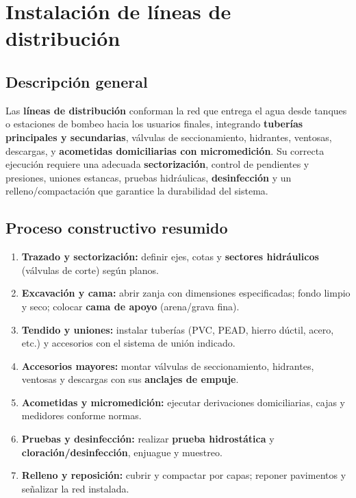 \documentclass[12pt]{article}
\begin{document}
	
	
	

	
	
	
	\section{Instalación de líneas de distribución}
	
	\subsection*{Descripción general}
	Las \textbf{líneas de distribución} conforman la red que entrega el agua desde tanques o estaciones de bombeo hacia los usuarios finales, integrando \textbf{tuberías principales y secundarias}, válvulas de seccionamiento, hidrantes, ventosas, descargas, y \textbf{acometidas domiciliarias con micromedición}.  
	Su correcta ejecución requiere una adecuada \textbf{sectorización}, control de pendientes y presiones, uniones estancas, pruebas hidráulicas, \textbf{desinfección} y un relleno/compactación que garantice la durabilidad del sistema.
	
	\subsection*{Proceso constructivo resumido}
	\begin{enumerate}[leftmargin=*, itemsep=2pt]
		\item \textbf{Trazado y sectorización:} definir ejes, cotas y \textbf{sectores hidráulicos} (válvulas de corte) según planos.
		\item \textbf{Excavación y cama:} abrir zanja con dimensiones especificadas; fondo limpio y seco; colocar \textbf{cama de apoyo} (arena/grava fina).
		\item \textbf{Tendido y uniones:} instalar tuberías (PVC, PEAD, hierro dúctil, acero, etc.) y accesorios con el sistema de unión indicado.
		\item \textbf{Accesorios mayores:} montar válvulas de seccionamiento, hidrantes, ventosas y descargas con sus \textbf{anclajes de empuje}.
		\item \textbf{Acometidas y micromedición:} ejecutar derivaciones domiciliarias, cajas y medidores conforme normas.
		\item \textbf{Pruebas y desinfección:} realizar \textbf{prueba hidrostática} y \textbf{cloración/desinfección}, enjuague y muestreo.
		\item \textbf{Relleno y reposición:} cubrir y compactar por capas; reponer pavimentos y señalizar la red instalada.
	\end{enumerate}
	
\end{document}
